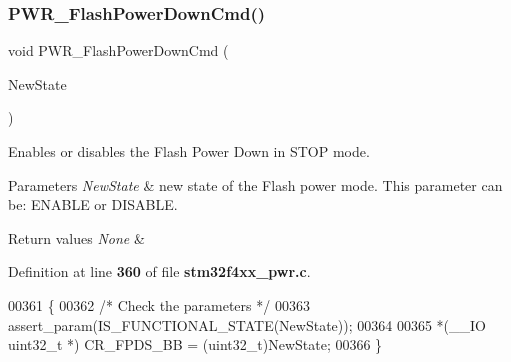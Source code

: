 \subsubsection{P\+W\+R\+\_\+\+Flash\+Power\+Down\+Cmd()}
{\footnotesize\ttfamily void P\+W\+R\+\_\+\+Flash\+Power\+Down\+Cmd (\begin{DoxyParamCaption}\item[{\textbf{ Functional\+State}}]{New\+State }\end{DoxyParamCaption})}



Enables or disables the Flash Power Down in S\+T\+OP mode. 


\begin{DoxyParams}{Parameters}
{\em New\+State} & new state of the Flash power mode. This parameter can be\+: E\+N\+A\+B\+LE or D\+I\+S\+A\+B\+LE. \\
\hline
\end{DoxyParams}

\begin{DoxyRetVals}{Return values}
{\em None} & \\
\hline
\end{DoxyRetVals}


Definition at line \textbf{ 360} of file \textbf{ stm32f4xx\+\_\+pwr.\+c}.


\begin{DoxyCode}
00361 \{
00362   \textcolor{comment}{/* Check the parameters */}
00363   assert_param(IS_FUNCTIONAL_STATE(NewState));
00364 
00365   *(\_\_IO uint32\_t *) CR_FPDS_BB = (uint32\_t)NewState;
00366 \}
\end{DoxyCode}
